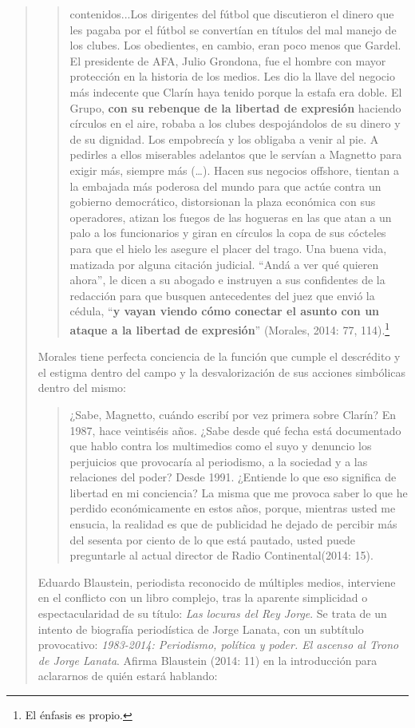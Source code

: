 \begin{quote}
\begin{quote}
	contenidos...Los dirigentes del fútbol que discutieron el dinero que les pagaba por el fútbol se convertían en títulos del mal manejo de los clubes. Los obedientes, en cambio, eran poco menos que Gardel. El presidente de AFA, Julio Grondona, fue el hombre con mayor protección en la historia de los medios. Les dio la llave del negocio más indecente que Clarín haya tenido porque la estafa era doble. El Grupo, \textbf{con su rebenque de la libertad de expresión} haciendo círculos en el aire, robaba a los clubes despojándolos de su dinero y de su dignidad. Los empobrecía y los obligaba a venir al pie. A pedirles a ellos miserables adelantos que le servían a Magnetto para exigir más, siempre más (\dots). Hacen sus negocios offshore, tientan a la embajada más poderosa del mundo para que actúe contra un gobierno democrático, distorsionan la plaza económica con sus operadores, atizan los fuegos de las hogueras en las que atan a un palo a los funcionarios y giran en círculos la copa de sus cócteles para que el hielo les asegure el placer del trago. Una buena vida, matizada por alguna citación judicial. \enquote{Andá a ver qué quieren ahora}, le dicen a su abogado e instruyen a sus confidentes de la redacción para que busquen antecedentes del juez que envió la cédula, \enquote{\textbf{y vayan viendo cómo conectar el asunto con un ataque a la libertad de expresión}} (Morales, 2014: 77, 114).\footnote{El énfasis es propio.}
\end{quote}


Morales tiene perfecta conciencia de la función que cumple el descrédito y el estigma dentro del campo y la desvalorización de sus acciones simbólicas dentro del mismo:

\begin{quote}
	¿Sabe, Magnetto, cuándo escribí por vez primera sobre Clarín? En 1987, hace veintiséis años. ¿Sabe desde qué fecha está documentado que hablo contra los multimedios como el suyo y denuncio los perjuicios que provocaría al periodismo, a la sociedad y a las relaciones del poder? Desde 1991. ¿Entiende lo que eso significa de libertad en mi conciencia? La misma que me provoca saber lo que he perdido económicamente en estos años, porque, mientras usted me ensucia, la realidad es que de publicidad he dejado de percibir más del sesenta por ciento de lo que está pautado, usted puede preguntarle al actual director de Radio Continental(2014: 15).
\end{quote}


Eduardo Blaustein, periodista reconocido de múltiples medios, interviene en el conflicto con un libro complejo, tras la aparente simplicidad o espectacularidad de su título: \emph{Las locuras del Rey Jorge}. Se trata de un intento de biografía periodística de Jorge Lanata, con un subtítulo provocativo: \emph{1983-2014: Periodismo, política y poder. El ascenso al Trono de Jorge Lanata}. Afirma Blaustein (2014: 11) en la introducción para aclararnos de quién estará hablando:


\end{quote}
